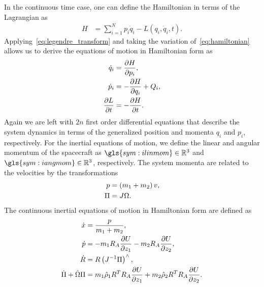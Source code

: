 In the continuous time case, one can define the Hamiltonian in terms of the Lagrangian as
\begin{align}\label{eq:hamiltonian}
	H &= \sum_{i = 1}^N p_i \dot{q}_i - L \left( q_i,\dot{q}_i, t \right).
\end{align}
Applying~\cref{eq:legendre_transform} and taking the variation of~\cref{eq:hamiltonian} allows us to derive the equations of motion in Hamiltonian form as
\begin{align}\label{eq:hamilton_eq}
	\dot{q}_i &= \frac{\partial H}{\partial p_i}, \\
	\dot{p}_i &= - \frac{\partial H}{\partial q_i} + Q_i, \\
	\frac{\partial L}{\partial t} &= -\frac{\partial H}{\partial t}.
\end{align}
Again we are left with \( 2n \) first order differential equations that describe the system dynamics in terms of the generalized position and momenta \( q_i \) and \( p_i\), respectively.
For the inertial equations of motion, we define the linear and angular momentum of the spacecraft as \( \gls{sym:ilinmom} \in \R^3\) and \( \gls{sym:iangmom} \in \R^3 \), respectively.
The system momenta are related to the velocities by the transformations
\begin{align}
    p &= \left( m_1 + m_2 \right) v , \\
    \Pi & = J \Omega.
\end{align}
The continuous inertial equations of motion in Hamiltonian form are defined as
\begin{align}
    \dot {x} &= \frac{p}{m_1 + m_2}, \label{eq:inertial_position_dynamics_hamiltonian}\\
    \dot {p} &= - m_1 R_A \frac{\partial U}{\partial z_1} - m_2 R_A \frac{\partial U}{\partial z_2}, \label{eq:inertial_velocity_dynamics_hamiltonian}\\
    \dot {R} &= R \left( J^{-1} \Pi \right)^\wedge, \label{eq:inertial_attitude_dynamics_hamiltonian}\\
    \dot{\Pi}  + \hat{\Omega} \Pi &= m_1 \hat{\rho}_1 R^T R_A \frac{\partial U}{\partial z_1} + m_2 \hat{\rho}_2 R^T R_A \frac{\partial U}{\partial z_2}. \label{eq:inertial_angvel_dynamics_hamiltonian}
\end{align}

